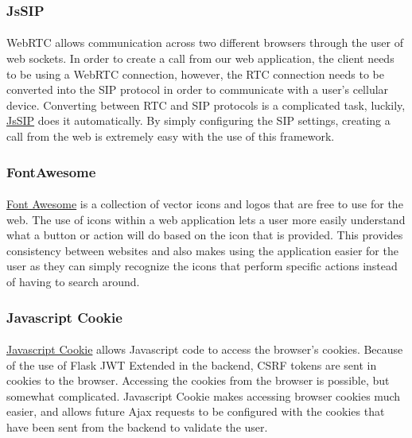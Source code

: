 \documentclass[12pt]{article}
\begin{document}
\subsubsection{JsSIP}	
\paragraph{}
	WebRTC allows communication across two different browsers through the user of web sockets. In order to create a call from our web application, the client needs to be using a WebRTC connection, however, the RTC connection needs to be converted into the SIP protocol in order to communicate with a user's cellular device. Converting between RTC and SIP protocols is a complicated task, luckily, \href{https://jssip.net/}{JsSIP} does it automatically. By simply configuring the SIP settings, creating a call from the web is extremely easy with the use of this framework.
	
\subsubsection{FontAwesome}	
\paragraph{}
	\href{https://fontawesome.com/}{Font Awesome} is a collection of vector icons and logos that are free to use for the web. The use of icons within a web application lets a user more easily understand what a button or action will do based on the icon that is provided. This provides consistency between websites and also makes using the application easier for the user as they can simply recognize the icons that perform specific actions instead of having to search around.
	
\subsubsection{Javascript Cookie}	
\paragraph{}
	\href{https://github.com/js-cookie/js-cookie}{Javascript Cookie} allows Javascript code to access the browser's cookies. Because of the use of Flask JWT Extended in the backend, CSRF tokens are sent in cookies to the browser. Accessing the cookies from the browser is possible, but somewhat complicated. Javascript Cookie makes accessing browser cookies much easier, and allows future Ajax requests to be configured with the cookies that have been sent from the backend to validate the user.
	
\end{document}
